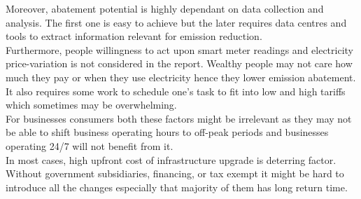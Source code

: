 \documentclass[11pt, twocolumn]{article}
\begin{document}
Moreover, abatement potential is highly dependant on data collection and analysis. The first one is easy to achieve but the later requires data centres and tools to extract information relevant for emission reduction.\\

Furthermore, people willingness to act upon smart meter readings and electricity price-variation is not considered in the report. Wealthy people may not care how much they pay or when they use electricity hence they lower emission abatement. It also requires some work to schedule one's task to fit into low and high tariffs which sometimes may be overwhelming.\\
For businesses consumers both these factors might be irrelevant as they may not be able to shift business operating hours to off-peak periods and businesses operating 24/7 will not benefit from it.\\

In most cases, high upfront cost of infrastructure upgrade is deterring factor. Without government subsidiaries, financing, or tax exempt it might be hard to introduce all the changes especially that majority of them has long return time.

{}

\end{document}
